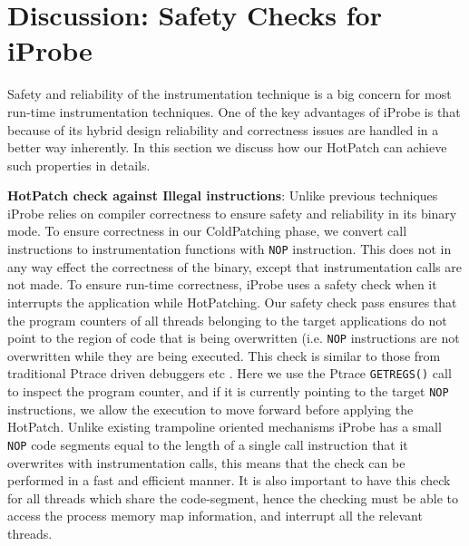 \section{Discussion: Safety Checks for iProbe}
\label{sec:safety}

Safety and reliability of the instrumentation technique is a big concern for most run-time instrumentation techniques.
One of the key advantages of iProbe is that because of its hybrid design reliability and correctness issues are handled in a better way inherently.
In this section we discuss how our HotPatch can achieve such properties in details.

\indent \textbf{HotPatch check against Illegal instructions}: \quad
Unlike previous techniques iProbe relies on compiler correctness to ensure safety and reliability in its binary mode.
To ensure correctness in our ColdPatching phase, we convert call instructions to instrumentation functions with \texttt{NOP} instruction. 
This does not in any way effect the correctness of the binary, except that instrumentation calls are not made. 
To ensure run-time correctness, iProbe uses a safety check when it interrupts the application while HotPatching. 
Our safety check pass ensures that the program counters of all threads belonging to the target applications do not point to the region of code that is being overwritten (i.e. \texttt{NOP} instructions are not overwritten while they are being executed.
This check is similar to those from traditional Ptrace\cite{ptrace} driven debuggers etc \cite{kaho,livepatch}. 
Here we use the Ptrace \texttt{GETREGS()} call to inspect the program counter, and if it is currently pointing to the target \texttt{NOP} instructions, we allow the execution to move forward before applying the HotPatch. 
Unlike existing trampoline oriented mechanisms iProbe has a small \texttt{NOP} code segments equal to the length of a single call instruction that it overwrites with instrumentation calls, this means that the check can be performed in a fast and efficient manner. 
It is also important to have this check for all threads which share the code-segment, hence the checking must be able to access the process memory map information, and interrupt all the relevant threads.

